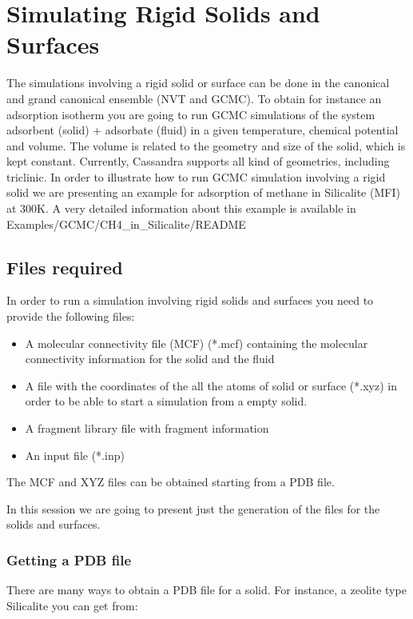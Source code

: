 \chapter{Simulating Rigid Solids and Surfaces}

The simulations involving a rigid solid or surface can be done in the canonical and grand canonical ensemble
(NVT and GCMC). To obtain for instance an adsorption isotherm you are going to run GCMC simulations 
of the system adsorbent (solid) + adsorbate (fluid) in a given temperature, chemical potential and volume. 
The volume is related to the geometry and size of the solid, which is kept constant. 
Currently, Cassandra supports all kind of geometries, including triclinic. 
In  order to illustrate how to run GCMC simulation involving a rigid solid we are presenting an example 
for adsorption of methane in Silicalite (MFI) at 300K. 
A very detailed information about this example is available in Examples/GCMC/CH4\_in\_Silicalite/README

\section{Files required} \label{sec:solid_files}
In order to run a simulation involving rigid solids and surfaces you need to provide the following files:

\begin{itemize}
\item A molecular connectivity file (MCF) (*.mcf) containing the molecular connectivity 
information for the solid and the fluid
\item A file with the coordinates of the all the atoms of solid or surface (*.xyz) 
in order to be able to start a simulation from a empty solid.
\item A fragment library file with fragment information 
\item An input file (*.inp)   
\end{itemize} 

The MCF and XYZ files can be obtained starting from a PDB file.
 
In this session we are going to present just the generation of the files for the solids and surfaces. 

\subsection{Getting a PDB file}\label{sec:solid_pdb}
There are many ways to obtain a PDB file for a solid. For instance, a zeolite type Silicalite you can get from:

